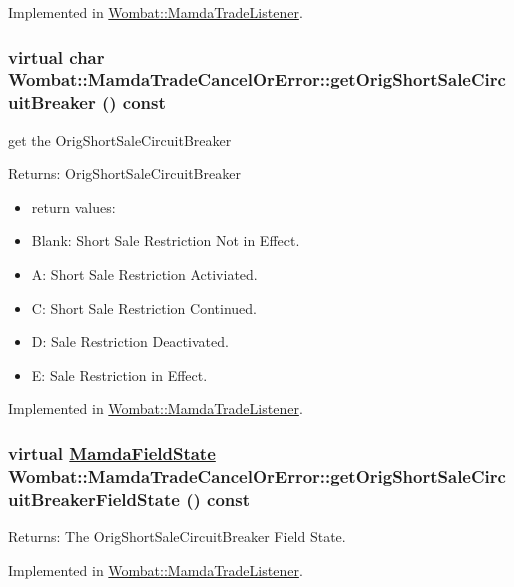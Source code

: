 Implemented in \hyperlink{classWombat_1_1MamdaTradeListener_0bb23e403d65e8c21a3e9474fba0273a}{Wombat::Mamda\-Trade\-Listener}.\hypertarget{classWombat_1_1MamdaTradeCancelOrError_54da84a40ec7c8cba6bc119c4fac7614}{
\subsubsection[getOrigShortSaleCircuitBreaker]{\setlength{\rightskip}{0pt plus 5cm}virtual char Wombat::Mamda\-Trade\-Cancel\-Or\-Error::get\-Orig\-Short\-Sale\-Circuit\-Breaker () const}}
\label{classWombat_1_1MamdaTradeCancelOrError_54da84a40ec7c8cba6bc119c4fac7614}


get the Orig\-Short\-Sale\-Circuit\-Breaker 

\begin{Desc}
\item[Returns:]Orig\-Short\-Sale\-Circuit\-Breaker \begin{itemize}
\item return values: \item Blank: Short Sale Restriction Not in Effect. \item A: Short Sale Restriction Activiated. \item C: Short Sale Restriction Continued. \item D: Sale Restriction Deactivated. \item E: Sale Restriction in Effect. \end{itemize}
\end{Desc}


Implemented in \hyperlink{classWombat_1_1MamdaTradeListener_faa29432bc36076ea95e370398b3cbae}{Wombat::Mamda\-Trade\-Listener}.\hypertarget{classWombat_1_1MamdaTradeCancelOrError_5d43acfae05347c26f47fab7f0fcdd95}{
\subsubsection[getOrigShortSaleCircuitBreakerFieldState]{\setlength{\rightskip}{0pt plus 5cm}virtual \hyperlink{namespaceWombat_93aac974f2ab713554fd12a1fa3b7d2a}{Mamda\-Field\-State} Wombat::Mamda\-Trade\-Cancel\-Or\-Error::get\-Orig\-Short\-Sale\-Circuit\-Breaker\-Field\-State () const}}
\label{classWombat_1_1MamdaTradeCancelOrError_5d43acfae05347c26f47fab7f0fcdd95}


\begin{Desc}
\item[Returns:]The Orig\-Short\-Sale\-Circuit\-Breaker Field State. \end{Desc}


Implemented in \hyperlink{classWombat_1_1MamdaTradeListener_1035dcb4392a8dbab128ae62cf9a6607}{Wombat::Mamda\-Trade\-Listener}.